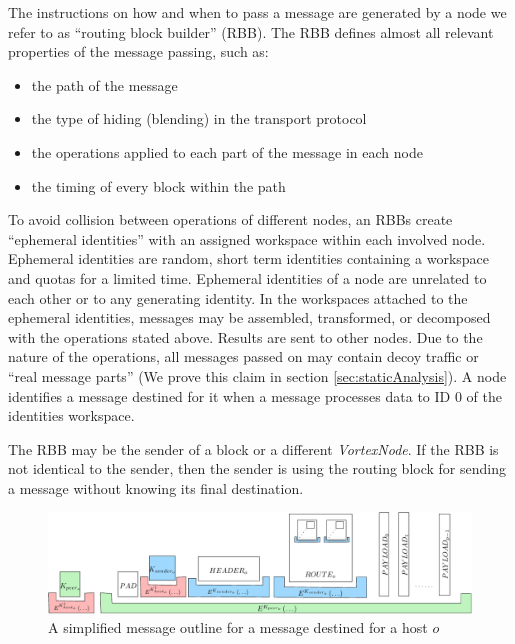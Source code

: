 \documentclass[acmsmall, screen, review]{acmart}
\begin{document}
	The instructions on how and when to pass a message are generated by a node we refer to as ``routing block builder'' (RBB). The RBB defines almost all relevant properties of the message passing, such as: 
	\begin{itemize}
		\item the path of the message
		\item the type of hiding (blending) in the transport protocol
		\item the operations applied to each part of the message in each node
		\item the timing of every block within the path
	\end{itemize}
	
	To avoid collision between operations of different nodes, an RBBs create ``ephemeral identities'' with an assigned workspace within each involved node. Ephemeral identities are random, short term identities containing a workspace and quotas for a limited time. Ephemeral identities of a node are unrelated to each other or to any generating identity. In the workspaces attached to the ephemeral identities, messages may be assembled, transformed, or decomposed with the operations stated above. Results are sent to other nodes. Due to the nature of the operations, all messages passed on may contain decoy traffic or ``real message parts'' (We prove this claim in section \ref{sec:staticAnalysis}). A node identifies a message destined for it when a message processes data to ID 0 of the identities workspace.
	
	The RBB may be the sender of a block or a different \emph{VortexNode}. If the RBB is not identical to the sender, then the sender is using the routing block for sending a message without knowing its final destination.
	
	\begin{figure}[ht]
		\centering\includegraphics[width=1.0\textwidth]{blockLayoutSimplified}
		\caption{A simplified message outline for a message destined for a host $o$}
		\label{fig:messageOutline}
	\end{figure}
	
\end{document}
